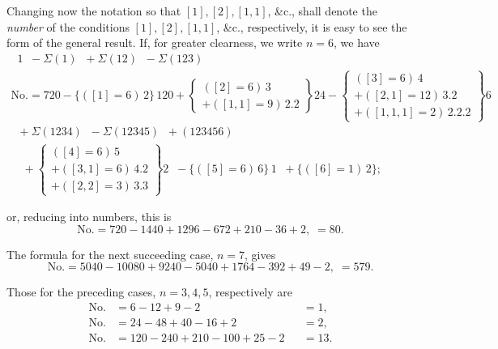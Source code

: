 \documentclass[11pt,a4paper]{article}
\begin{document}
\medskip

Changing now the notation so that $[1], [2], [1, 1]$, \&c., shall denote the \emph{number} of the conditions $[1], [2], [1, 1]$, \&c., respectively, it is easy to see the form of the general result. If, for greater clearness, we write $n = 6$, we have
\[
\begin{array}{l}
\;\; 1 \;\; - \Sigma(1) \;\; + \Sigma(12) \;\; - \Sigma(123)\\[2pt]
\text{No.} = 720 - \{([1] = 6)\,2\}\,120 + \left\{\begin{array}{l}([2] = 6)\,3\\ + ([1,1] = 9)\,2.2\end{array}\right\}24 - \left\{\begin{array}{l}([3] = 6)\,4\\ + ([2,1] = 12)\,3.2\\ + ([1,1,1] = 2)\,2.2.2\end{array}\right\}6\\[2pt]
\;\; + \Sigma(1234) \;\; - \Sigma(12345) \;\; + (123456)\\[2pt]
\quad + \left\{\begin{array}{l}([4] = 6)\,5\\ + ([3,1] = 6)\,4.2\\ + ([2,2] = 3)\,3.3\end{array}\right\}2 \;\; - \{([5] = 6)\,6\}\,1 \;\; + \{([6] = 1)\,2\};
\end{array}
\]

\newpage


\noindent or, reducing into numbers, this is
\[
\text{No.} = 720 - 1440 + 1296 - 672 + 210 - 36 + 2,\; = 80.
\]

The formula for the next succeeding case, $n = 7$, gives
\[
\text{No.} = 5040 - 10080 + 9240 - 5040 + 1764 - 392 + 49 - 2,\; = 579.
\]

Those for the preceding cases, $n = 3, 4, 5$, respectively are
\begin{align*}
\text{No.} &= 6 - 12 + 9 - 2 &&= 1,\\
\text{No.} &= 24 - 48 + 40 - 16 + 2 &&= 2,\\
\text{No.} &= 120 - 240 + 210 - 100 + 25 - 2 &&= 13.
\end{align*}
\end{document}
